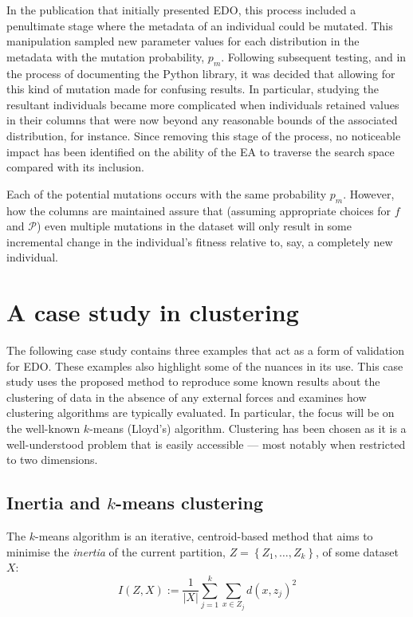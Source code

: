 In the publication that initially presented EDO, this process included a
penultimate stage where the metadata of an individual could be mutated. This
manipulation sampled new parameter values for each distribution in the metadata
with the mutation probability, \(p_m\). Following subsequent testing, and in the
process of documenting the Python library, it was decided that allowing for this
kind of mutation made for confusing results. In particular, studying the
resultant individuals became more complicated when individuals retained values
in their columns that were now beyond any reasonable bounds of the associated
distribution, for instance. Since removing this stage of the process, no
noticeable impact has been identified on the ability of the EA to traverse the
search space compared with its inclusion.


Each of the potential mutations occurs with the same probability \(p_m\).
However, how the columns are maintained assure that (assuming appropriate
choices for \(f\) and \(\mathcal{P}\)) even multiple mutations in the dataset
will only result in some incremental change in the individual's fitness relative
to, say, a completely new individual.



\section{A case study in clustering}\label{sec:examples}

The following case study contains three examples that act as a form of
validation for EDO. These examples also highlight some of the nuances in its
use. This case study uses the proposed method to reproduce some known results
about the clustering of data in the absence of any external forces and examines
how clustering algorithms are typically evaluated. In particular, the focus will
be on the well-known \(k\)-means (Lloyd's) algorithm. Clustering has been chosen
as it is a well-understood problem that is easily accessible --- most notably
when restricted to two dimensions.

\subsection{Inertia and \(k\)-means clustering}

The \(k\)-means algorithm is an iterative, centroid-based method that aims to
minimise the \emph{inertia} of the current partition, \(Z = \left\{Z_1, \ldots,
Z_k\right\}\), of some dataset \(X\):
\begin{equation}
    I(Z, X) := \frac{1}{|X|} \sum_{j=1}^{k} \sum_{x \in Z_j} {d(x, z_j)}^2
    \label{eq:inertia}
\end{equation}


